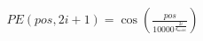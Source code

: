 \documentclass[preview]{standalone}
\begin{document}
\begin{align*}
PE(pos, 2i+1) = \cos\left( \frac{pos}{10000^{\frac{2i}{d_{\text{model}}}}} \right)
\end{align*}
\end{document}
